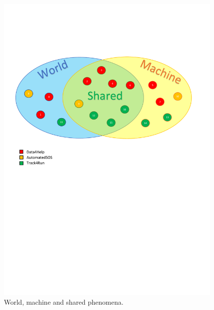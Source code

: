 \documentclass[a4paper]{article}
\begin{document}
\begin{figure}[H]
    \centering
    \includegraphics[width=\linewidth]{worldMachineShared-small}
    \caption{World, machine and shared phenomena.}
    \label{fig:my_label}
\end{figure}
\end{document}
